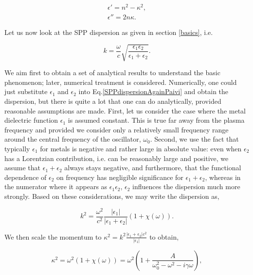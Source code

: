 \documentclass[12pt]{iopart}
\begin{document}
\begin{eqnarray}
\epsilon' = n^2 - \kappa^2, \label{epsilon_real_PT} \\
\epsilon'' = 2 n \kappa. \label{epsilon_imag_PT}
\end{eqnarray}

Let us now look at the SPP dispersion as given in section \ref{basics}, i.e.

\begin{equation}
k = \frac{\omega}{c} \sqrt{\frac{\epsilon_1 \epsilon_2}{\epsilon_1 + \epsilon_2}}.  \label{SPPdispersionAgainPaivi}
\end{equation}

\noindent We aim first to obtain a set of analytical results to understand the basic phenomenon; later, numerical treatment is considered. Numerically, one could just substitute $\epsilon_1$ and $\epsilon_2$ into Eq.\ref{SPPdispersionAgainPaivi} and obtain the dispersion, but there is quite a lot that one can do analytically, provided reasonable assumptions are made. First, let us consider the case where the metal dielectric function $\epsilon_1$ is assumed constant. This is true far away from the plasma frequency and provided we consider only a relatively small frequency range around the central frequency of the oscillator, $\omega_0$. Second, we use the fact that typically $\epsilon_1$ for metals is negative and rather large in absolute value: even when $\epsilon_2$ has a Lorentzian contribution, i.e. can be reasonably large and positive, we assume that $\epsilon_1 + \epsilon_2$ always stays negative, and furthermore, that the functional dependence of $\epsilon_2$ on frequency has negligible significance for $\epsilon_1 + \epsilon_2$, whereas in the numerator where it appears as $\epsilon_1 \epsilon_2$,  $\epsilon_2$ influences the dispersion much more strongly. Based on these considerations, we may write the dispersion as,
 
\begin{equation}
k^2 = \frac{\omega^2}{c^2} \frac{|\epsilon_1|}{|\epsilon_1 + \epsilon_2|} (1 + \chi(\omega)).
\end{equation}

\noindent We then scale the momentum to $\kappa^2 = k^2 \frac{|\epsilon_1 + \epsilon_2|c^2}{|\epsilon_1|}$ to obtain,

\begin{equation}
\kappa^2 =\omega^2(1 + \chi(\omega)) =\omega^2 \left( 1 + \frac{A}{ \omega_0^2 - \omega^2 - i\gamma \omega} \right) ,
\label{cleanDispersionPT}
\end{equation}
\end{document}
